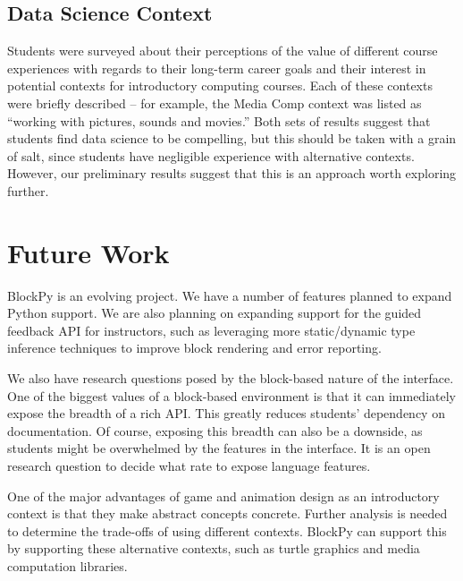 \documentclass[10pt, conference, compsocconf]{IEEEtran}
\begin{document}

\subsection{Data Science Context}

Students were surveyed about their perceptions of the value of different course experiences with regards to their long-term career goals and their interest in potential contexts for introductory computing courses.
Each of these contexts were briefly described -- for example, the Media Comp context was listed as ``working with pictures, sounds and movies.''
Both sets of results suggest that students find data science to be compelling, but this should be taken with a grain of salt, since students have negligible experience with alternative contexts.
However, our preliminary results suggest that this is an approach worth exploring further.

\section{Future Work}

BlockPy is an evolving project.
We have a number of features planned to expand Python support.
We are also planning on expanding support for the guided feedback API for instructors, such as leveraging more static/dynamic type inference techniques to improve block rendering and error reporting.

We also have research questions posed by the block-based nature of the interface.
One of the biggest values of a block-based environment is that it can immediately expose the breadth of a rich API.
This greatly reduces students' dependency on documentation.
Of course, exposing this breadth can also be a downside, as students might be overwhelmed by the features in the interface.
It is an open research question to decide what rate to expose language features.

One of the major advantages of game and animation design as an introductory context is that they make abstract concepts concrete. 
Further analysis is needed to determine the trade-offs of using different contexts.
BlockPy can support this by supporting these alternative contexts, such as turtle graphics and media computation libraries.
\end{document}
